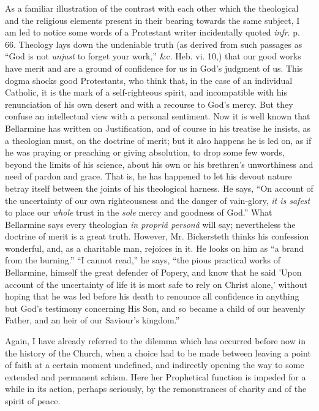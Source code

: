 As a familiar illustration of the contrast with each other which
the theological and the religious elements present in their bearing
towards the same subject, I am led to notice some words of a
Protestant writer incidentally quoted \emph{infr}. p. 66. Theology
lays down the undeniable truth (as derived from such passages as
``God is not \emph{unjust} to forget your work,'' \&c. Heb.
vi. 10,) that our good works have merit and are a ground of confidence
for us in God's judgment of us. This dogma shocks good Protestants,
who think that, in the case of an individual Catholic, it is the mark
of a self-righteous spirit, and incompatible with his renunciation of
his own desert and with a recourse to God's mercy. But they confuse an
intellectual view with a personal sentiment. Now it is well known that
Bellarmine has written on Justification, and of course in his treatise
he insists, as a theologian must, on the doctrine of merit; but it
also happens he is led on, as if he was praying or preaching or giving
absolution, to drop some few words, beyond the limits of his science,
about his own or his brethren's unworthiness and need of pardon and
grace. That is, he has happened to let his devout nature betray itself between the joints of his theological harness. He says,
``On account of the uncertainty of our own righteousness and the
danger of vain-glory, \emph{it is safest} to place our \emph{whole}
trust in the \emph{sole} mercy and goodness of God.'' What
Bellarmine says every theologian \emph{in propriâ personâ} will say;
nevertheless the doctrine of merit is a great truth. However, Mr.
Bickersteth thinks his confession wonderful, and, as a charitable man,
rejoices in it. He looks on him as ``a brand from the
burning.'' ``I cannot read,'' he says, ``the pious
practical works of Bellarmine, himself the great defender of Popery,
and know that he said 'Upon account of the uncertainty of life it is
most safe to rely on Christ alone,' without hoping that he was led
before his death to renounce all confidence in anything but God's
testimony concerning His Son, and so became a child of our heavenly
Father, and an heir of our Saviour's kingdom.''

Again, I have already referred to the dilemma which has occurred
before now in the history of the Church, when a choice had to be made
between leaving a point of faith at a certain moment undefined, and
indirectly opening the way to some extended and permanent schism. Here
her Prophetical function is impeded for a while in its action, perhaps
seriously, by the remonstrances of charity and of the spirit of peace.

